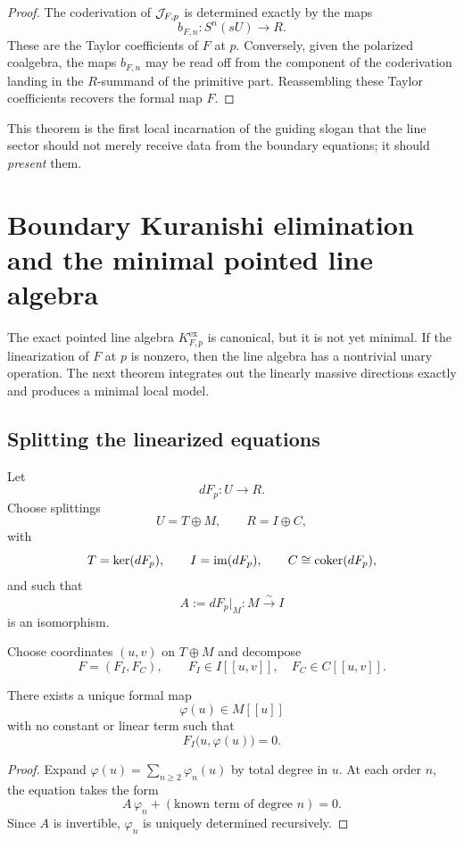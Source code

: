 \begin{proof}
The coderivation of $\mathcal J_{F,p}$ is determined exactly by the maps
\[
b_{F,n}:S^n(sU)\to R.
\]
These are the Taylor coefficients of $F$ at $p$. Conversely, given the polarized coalgebra, the maps $b_{F,n}$ may be read off from the component of the coderivation landing in the $R$-summand of the primitive part. Reassembling these Taylor coefficients recovers the formal map $F$.
\end{proof}

\begin{remark}
This theorem is the first local incarnation of the guiding slogan that the line sector should not merely receive data from the boundary equations; it should \emph{present} them.
\end{remark}


\section{Boundary Kuranishi elimination and the minimal pointed line algebra}%

The exact pointed line algebra $K_{F,p}^{\mathrm{ex}}$ is canonical, but it is not yet minimal. If the linearization of $F$ at $p$ is nonzero, then the line algebra has a nontrivial unary operation. The next theorem integrates out the linearly massive directions exactly and produces a minimal local model.

\subsection{Splitting the linearized equations}

Let
\[
dF_p:U\to R.
\]
Choose splittings
\[
U=T\oplus M,
\qquad
R=I\oplus C,
\]
with
\[
T=\ker(dF_p),
\qquad
I=\operatorname{im}(dF_p),
\qquad
C\cong \operatorname{coker}(dF_p),
\]
and such that
\[
A:=dF_p|_M:M\xrightarrow{\sim} I
\]
is an isomorphism.

Choose coordinates $(u,v)$ on $T\oplus M$ and decompose
\[
F=(F_I,F_C),
\qquad
F_I\in I[[u,v]],
\quad
F_C\in C[[u,v]].
\]

\begin{lemma}%
There exists a unique formal map
\[
\varphi(u)\in M[[u]]
\]
with no constant or linear term such that
\[
F_I\bigl(u,\varphi(u)\bigr)=0.
\]
\end{lemma}

\begin{proof}
Expand $\varphi(u)=\sum_{n\ge 2}\varphi_n(u)$ by total degree in $u$. At each order $n$, the equation takes the form
\[
A\,\varphi_n + (\text{known term of degree }n)=0.
\]
Since $A$ is invertible, $\varphi_n$ is uniquely determined recursively.
\end{proof}

